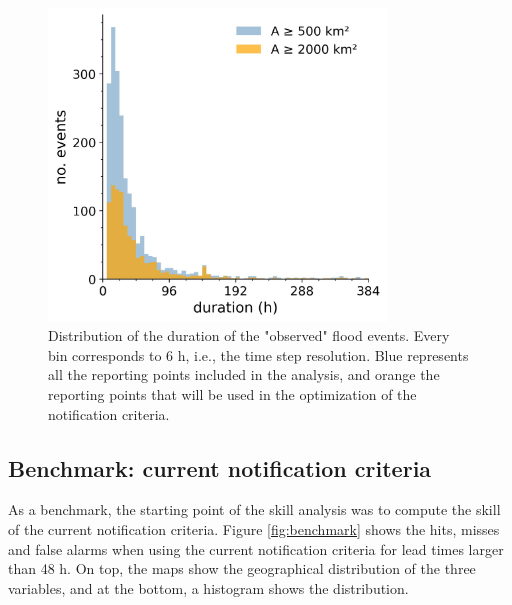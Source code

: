 \documentclass[preprint,12pt]{elsarticle}
\begin{document}
\begin{figure}
    \centering
    \includegraphics[width=0.8\textwidth]{figures/duration_distribution_2371points.jpg}
    \caption{Distribution of the duration of the "observed" flood events. Every bin corresponds to 6 h, i.e., the time step resolution. Blue represents all the reporting points included in the analysis, and orange the reporting points that will be used in the optimization of the notification criteria.}
    \label{fig:event_duration}
\end{figure}

\subsection{Benchmark: current notification criteria}

As a benchmark, the starting point of the skill analysis was to compute the skill of the current notification criteria. Figure \ref{fig:benchmark} shows the hits, misses and false alarms when using the current notification criteria for lead times larger than 48 h. On top, the maps show the geographical distribution of the three variables, and at the bottom, a histogram shows the distribution.
\end{document}
